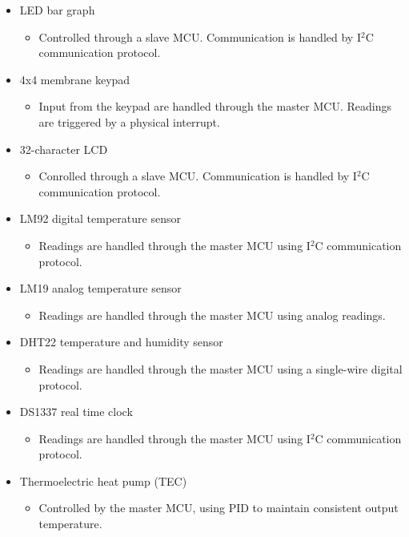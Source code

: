 \documentclass{article}
\begin{document}
\begin{itemize}
	\item LED bar graph
		\begin{itemize}
			\item Controlled through a slave MCU. Communication is handled by I\(^2\)C communication protocol.
		\end{itemize}
	\item 4x4 membrane keypad
		\begin{itemize}
			\item Input from the keypad are handled through the master MCU. Readings are triggered by a physical interrupt.
		\end{itemize}
	\item 32-character LCD
		\begin{itemize}
			\item Conrolled through a slave MCU. Communication is handled by I\(^2\)C communication protocol.
		\end{itemize}
	\item LM92 digital temperature sensor
		\begin{itemize}
			\item Readings are handled through the master MCU using I\(^2\)C communication protocol.
		\end{itemize}
	\item LM19 analog temperature sensor
		\begin{itemize}
			\item Readings are handled through the master MCU using analog readings.
		\end{itemize}
	\item DHT22 temperature and humidity sensor
		\begin{itemize}
			\item Readings are handled through the master MCU using a single-wire digital protocol.
		\end{itemize}
	\item DS1337 real time clock
		\begin{itemize}
			\item Readings are handled through the master MCU using I\(^2\)C communication protocol.
		\end{itemize}
	\item Thermoelectric heat pump (TEC)
		\begin{itemize}
			\item Controlled by the master MCU, using PID to maintain consistent output temperature.
		\end{itemize}
\end{itemize}
\end{document}
